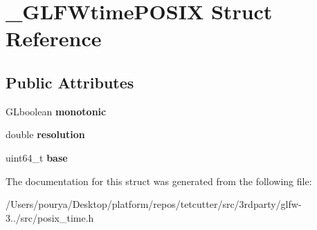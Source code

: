 \hypertarget{struct__GLFWtimePOSIX}{}\section{\+\_\+\+G\+L\+F\+Wtime\+P\+O\+S\+I\+X Struct Reference}
\label{struct__GLFWtimePOSIX}
\subsection*{Public Attributes}
\begin{DoxyCompactItemize}
\item 
\hypertarget{struct__GLFWtimePOSIX_af21da17e70d9abd9d658540b83bd8ef7}{}G\+Lboolean {\bfseries monotonic}\label{struct__GLFWtimePOSIX_af21da17e70d9abd9d658540b83bd8ef7}

\item 
\hypertarget{struct__GLFWtimePOSIX_a687c9511a9e7b5f8e583fd2e8289efb0}{}double {\bfseries resolution}\label{struct__GLFWtimePOSIX_a687c9511a9e7b5f8e583fd2e8289efb0}

\item 
\hypertarget{struct__GLFWtimePOSIX_a6d435cd084f70ec69162f1610b4d11b5}{}uint64\+\_\+t {\bfseries base}\label{struct__GLFWtimePOSIX_a6d435cd084f70ec69162f1610b4d11b5}

\end{DoxyCompactItemize}


The documentation for this struct was generated from the following file\+:\begin{DoxyCompactItemize}
\item 
/\+Users/pourya/\+Desktop/platform/repos/tetcutter/src/3rdparty/glfw-\/3../src/posix\+\_\+time.\+h\end{DoxyCompactItemize}
